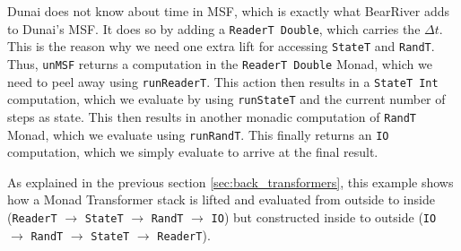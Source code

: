Dunai does not know about time in MSF, which is exactly what BearRiver adds to Dunai's MSF. It does so by adding a \texttt{ReaderT Double}, which carries the $\Delta t$. This is the reason why we need one extra lift for accessing \texttt{StateT} and \texttt{RandT}. Thus, \texttt{unMSF} returns a computation in the \texttt{ReaderT Double} Monad, which we need to peel away using \texttt{runReaderT}. This action then results in a \texttt{StateT Int} computation, which we evaluate by using \texttt{runStateT} and the current number of steps as state. This then results in another monadic computation of \texttt{RandT} Monad, which we evaluate using \texttt{runRandT}. This finally returns an \texttt{IO} computation, which we simply evaluate to arrive at the final result.

As explained in the previous section \ref{sec:back_transformers}, this example shows how a Monad Transformer stack is lifted and evaluated from outside to inside (\texttt{ReaderT} $\rightarrow$ \texttt{StateT} $\rightarrow$ \texttt{RandT} $\rightarrow$ \texttt{IO}) but constructed inside to outside (\texttt{IO} $\rightarrow$ \texttt{RandT} $\rightarrow$ \texttt{StateT} $\rightarrow$ \texttt{ReaderT}).